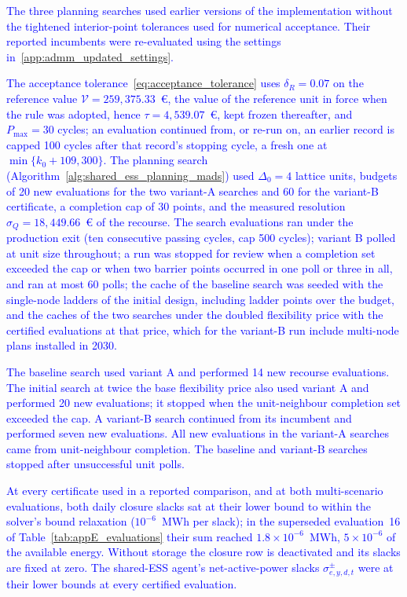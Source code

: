 \textcolor{blue}{
    The three planning searches used earlier versions of the implementation without the tightened interior-point tolerances used for numerical acceptance. Their reported incumbents were re-evaluated using the settings in~\ref{app:admm_updated_settings}.
}

\textcolor{blue}{
    The acceptance tolerance~\eqref{eq:acceptance_tolerance} uses $\delta_R = 0.07$ on the reference value $\mathcal{V} = 259{,}375.33$~\euro{}, the value of the reference unit in force when the rule was adopted, hence $\tau = 4{,}539.07$~\euro{}, kept frozen thereafter, and $P_{\max} = 30$ cycles;
    an evaluation continued from, or re-run on, an earlier record is capped 100 cycles after that record's stopping cycle, a fresh one at $\min\{k_0 + 109, 300\}$. The planning search (Algorithm~\ref{alg:shared_ess_planning_mads}) used $\Delta_0 = 4$ lattice units, budgets of 20 new evaluations for the two variant-A searches and 60 for the variant-B certificate, a completion cap of 30 points, and the measured resolution $\sigma_Q = 18{,}449.66$~\euro{} of the recourse.
    The search evaluations ran under the production exit (ten consecutive passing cycles, cap 500 cycles); variant B polled at unit size throughout; a run was stopped for review when a completion set exceeded the cap or when two barrier points occurred in one poll or three in all, and ran at most 60 polls; the cache of the baseline search was seeded with the single-node ladders of the initial design, including ladder points over the budget, and the caches of the two searches under the doubled flexibility price with the certified evaluations at that price, which for the variant-B run include multi-node plans installed in 2030.
}

\textcolor{blue}{
    The baseline search used variant A and performed 14 new recourse evaluations. The initial search at twice the base flexibility price also used variant A and performed 20 new evaluations; it stopped when the unit-neighbour completion set exceeded the cap. A variant-B search continued from its incumbent and performed seven new evaluations. All new evaluations in the variant-A searches came from unit-neighbour completion. The baseline and variant-B searches stopped after unsuccessful unit polls.
}

\textcolor{blue}{
    At every certificate used in a reported comparison, and at both multi-scenario evaluations, both daily closure slacks sat at their lower bound to within the solver's bound relaxation ($10^{-6}$~MWh per slack); in the superseded evaluation~16 of Table~\ref{tab:appE_evaluations} their sum reached $1.8 \times 10^{-6}$~MWh, $5 \times 10^{-6}$ of the available energy. Without storage the closure row is deactivated and its slacks are fixed at zero.
    The shared-ESS agent's net-active-power slacks $\sigma^\pm_{e,y,d,t}$ were at their lower bounds at every certified evaluation.
}

